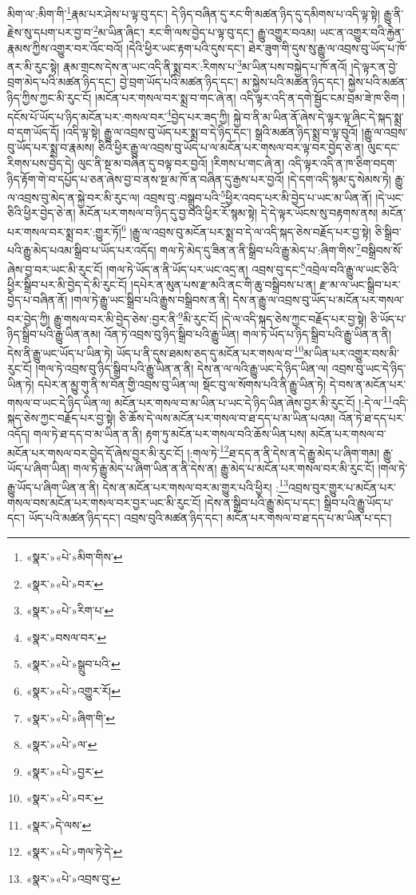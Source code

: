 མིག་ལ་:མིག་གི་\footnote{«སྣར་»«པེ་»མིག་གིས་}རྣམ་པར་ཤེས་པ་ལྟ་བུ་དང་། དེ་ཉིད་བཞིན་དུ་རང་གི་མཚན་ཉིད་དུ་དམིགས་པ་འདི་ལྟ་སྟེ། རྒྱུ་ནི་རྗེས་སུ་དཔག་པར་བྱ་བ་\footnote{«སྣར་»«པེ་»བར་}མ་ཡིན་ཞིང་། རང་གི་ལས་བྱེད་པ་ལྟ་བུ་དང་། རྒྱུ་འགྱུར་བའམ། ཡང་ན་འགྱུར་བའི་རྐྱེན་རྣམས་ཀྱིས་འགྱུར་བར་འོང་བའོ། །དེའི་ཕྱིར་ཡང་རྟག་པའི་དུས་དང་། ཐེར་ཟུག་གི་དུས་སུ་རྒྱུ་ལ་འབྲས་བུ་ཡོད་པ་ཁོ་ནར་མི་རུང་སྟེ། རྣམ་གྲངས་དེས་ན་ཡང་འདི་ནི་སྨྲ་བར་:རིགས་པ་\footnote{«སྣར་»«པེ་»རིག་པ་}མ་ཡིན་པས་བསྐྱེད་པ་ཁོ་ནའོ། །དེ་ལྟར་ན་བྱེ་བྲག་མེད་པའི་མཚན་ཉིད་དང་། བྱེ་བྲག་ཡོད་པའི་མཚན་ཉིད་དང་། མ་སྐྱེས་པའི་མཚན་ཉིད་དང་། སྐྱེས་པའི་མཚན་ཉིད་ཀྱིས་ཀྱང་མི་རུང་ངོ། །མངོན་པར་གསལ་བར་སྨྲ་བ་གང་ཞེ་ན། འདི་ལྟར་འདི་ན་དགེ་སྦྱོང་ངམ་བྲམ་ཟེ་ཁ་ཅིག །དངོས་པོ་ཡོད་པ་ཉིད་མངོན་པར་:གསལ་བར་\footnote{«སྣར་»བསལ་བར་}བྱེད་པར་ཟད་ཀྱི། སྐྱེ་བ་ནི་མ་ཡིན་ནོ་ཞེས་དེ་ལྟར་ལྟ་ཞིང་དེ་སྐད་སྨྲ་བ་དག་ཡོད་དོ། །འདི་ལྟ་སྟེ། རྒྱུ་ལ་འབྲས་བུ་ཡོད་པར་སྨྲ་བ་དེ་ཉིད་དང་། སྒྲའི་མཚན་ཉིད་སྨྲ་བ་ལྟ་བུའོ། །རྒྱུ་ལ་འབྲས་བུ་ཡོད་པར་སྨྲ་བ་རྣམས། ཅིའི་ཕྱིར་རྒྱུ་ལ་འབྲས་བུ་ཡོད་པ་ལ་མངོན་པར་གསལ་བར་ལྟ་བར་བྱེད་ཅེ་ན། ལུང་དང་རིགས་པས་བྱེད་དེ། ལུང་ནི་སྔ་མ་བཞིན་དུ་བལྟ་བར་བྱའོ། །རིགས་པ་གང་ཞེ་ན། འདི་ལྟར་འདི་ན་ཁ་ཅིག་བདག་ཉིད་རྟོག་གེ་བ་དཔྱོད་པ་ཅན་ཞེས་བྱ་བ་ནས་སྔ་མ་ཁོ་ན་བཞིན་དུ་རྒྱས་པར་བྱའོ། །དེ་དག་འདི་སྙམ་དུ་སེམས་ཏེ། རྒྱུ་ལ་འབྲས་བུ་མེད་ན་སྐྱེ་བར་མི་རུང་ལ། འབྲས་བུ་:བསྒྲུབ་པའི་\footnote{«སྣར་»«པེ་»སྒྲུབ་པའི་}ཕྱིར་འབད་པར་མི་བྱེད་པ་ཡང་མ་ཡིན་ནོ། །དེ་ཡང་ཅིའི་ཕྱིར་བྱེད་ཅེ་ན། མངོན་པར་གསལ་བ་ཉིད་དུ་བྱ་བའི་ཕྱིར་རོ་སྙམ་སྟེ། དེ་དེ་ལྟར་ཡོངས་སུ་བརྟགས་ནས། མངོན་པར་གསལ་བར་སྨྲ་བར་:གྱུར་ཏོ།\footnote{«སྣར་»«པེ་»འགྱུར་རོ།} །རྒྱུ་ལ་འབྲས་བུ་མངོན་པར་སྨྲ་བ་དེ་ལ་འདི་སྐད་ཅེས་བརྗོད་པར་བྱ་སྟེ། ཅི་སྒྲིབ་པའི་རྒྱུ་མེད་པའམ་སྒྲིབ་པ་ཡོད་པར་འདོད། གལ་ཏེ་མེད་དུ་ཟིན་ན་ནི་སྒྲིབ་པའི་རྒྱུ་མེད་པ་:ཞིག་གིས་\footnote{«སྣར་»«པེ་»ཞིག་གི་}བསྒྲིབས་སོ་ཞེས་བྱ་བར་ཡང་མི་རུང་ངོ། །གལ་ཏེ་ཡོད་ན་ནི་ཡོད་པར་ཡང་འདྲ་ན། འབྲས་བུ་དང་\footnote{«སྣར་»«པེ་»ལ་}འབྲེལ་བའི་རྒྱུ་ལ་ཡང་ཅིའི་ཕྱིར་སྒྲིབ་པར་མི་བྱེད་དེ་མི་རུང་ངོ། །དཔེར་ན་མུན་པས་རྫ་མའི་ནང་གི་ཆུ་བསྒྲིབས་པ་ན། རྫ་མ་ལ་ཡང་སྒྲིབ་པར་བྱེད་པ་བཞིན་ནོ། །གལ་ཏེ་རྒྱུ་ཡང་སྒྲིབ་པའི་རྒྱུས་བསྒྲིབས་ན་ནི། དེས་ན་རྒྱུ་ལ་འབྲས་བུ་ཡོད་པ་མངོན་པར་གསལ་བར་བྱེད་ཀྱི། རྒྱུ་གསལ་བར་མི་བྱེད་ཅེས་:བྱར་ནི་\footnote{«སྣར་»«པེ་»བྱར་}མི་རུང་ངོ། །དེ་ལ་འདི་སྐད་ཅེས་ཀྱང་བརྗོད་པར་བྱ་སྟེ། ཅི་ཡོད་པ་ཉིད་སྒྲིབ་པའི་རྒྱུ་ཡིན་ནམ། འོན་ཏེ་འབྲས་བུ་ཉིད་སྒྲིབ་པའི་རྒྱུ་ཡིན། གལ་ཏེ་ཡོད་པ་ཉིད་སྒྲིབ་པའི་རྒྱུ་ཡིན་ན་ནི། དེས་ནི་རྒྱུ་ཡང་ཡོད་པ་ཡིན་ཏེ། ཡོད་པ་ནི་དུས་ཐམས་ཅད་དུ་མངོན་པར་གསལ་བ་\footnote{«སྣར་»«པེ་»བར་}མ་ཡིན་པར་འགྱུར་བས་མི་རུང་ངོ། །གལ་ཏེ་འབྲས་བུ་ཉིད་སྒྲིབ་པའི་རྒྱུ་ཡིན་ན་ནི། དེས་ན་ལ་ལའི་རྒྱུ་ཡང་དེ་ཉིད་ཡིན་ལ། འབྲས་བུ་ཡང་དེ་ཉིད་ཡིན་ཏེ། དཔེར་ན་མྱུ་གུ་ནི་ས་བོན་གྱི་འབྲས་བུ་ཡིན་ལ། སྡོང་བུ་ལ་སོགས་པའི་ནི་རྒྱུ་ཡིན་ཏེ། དེ་བས་ན་མངོན་པར་གསལ་བ་ཡང་དེ་ཉིད་ཡིན་ལ། མངོན་པར་གསལ་བ་མ་ཡིན་པ་ཡང་དེ་ཉིད་ཡིན་ཞེས་བྱར་མི་རུང་ངོ། །:དེ་ལ་\footnote{«སྣར་»དེ་ལས་}འདི་སྐད་ཅེས་ཀྱང་བརྗོད་པར་བྱ་སྟེ། ཅི་ཆོས་དེ་ལས་མངོན་པར་གསལ་བ་ཐ་དད་པ་མ་ཡིན་པའམ། འོན་ཏེ་ཐ་དད་པར་འདོད། གལ་ཏེ་ཐ་དད་བ་མ་ཡིན་ན་ནི། རྟག་ཏུ་མངོན་པར་གསལ་བའི་ཆོས་ཡིན་པས། མངོན་པར་གསལ་བ་མངོན་པར་གསལ་བར་བྱེད་དོ་ཞེས་བྱར་མི་རུང་ངོ། །:གལ་ཏེ་\footnote{«སྣར་»«པེ་»གལ་ཏེ་དེ་}ཐ་དད་ན་ནི་དེས་ན་དེ་རྒྱུ་མེད་པ་ཞིག་གམ། རྒྱུ་ཡོད་པ་ཞིག་ཡིན། གལ་ཏེ་རྒྱུ་མེད་པ་ཞིག་ཡིན་ན་ནི་དེས་ན། རྒྱུ་མེད་པ་མངོན་པར་གསལ་བར་མི་རུང་ངོ། །གལ་ཏེ་རྒྱུ་ཡོད་པ་ཞིག་ཡིན་ན་ནི། དེས་ན་མངོན་པར་གསལ་བར་མ་གྱུར་པའི་ཕྱིར། :\footnote{«སྣར་»«པེ་»འབྲས་བུ་}འབྲས་བུར་གྱུར་པ་མངོན་པར་གསལ་བས་མངོན་པར་གསལ་བར་བྱར་ཡང་མི་རུང་ངོ། །དེས་ན་སྒྲིབ་པའི་རྒྱུ་མེད་པ་དང་། སྒྲིབ་པའི་རྒྱུ་ཡོད་པ་དང་། ཡོད་པའི་མཚན་ཉིད་དང་། འབྲས་བུའི་མཚན་ཉིད་དང་། མངོན་པར་གསལ་བ་ཐ་དད་པ་མ་ཡིན་པ་དང་། 